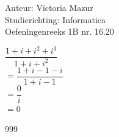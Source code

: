 \documentclass[a4paper]{article}
\begin{document}
  
\noindent \large Auteur: Victoria Mazur \\
\noindent \large Studierichting: Informatica\\
\noindent \large Oefeningenreeks 1B nr. 16.20\\

\medskip

\normalsize

$ \dfrac{1+i+i^2+i^3}{1+i+i^2} $ \\

$ = \dfrac{1+i-1-i}{1+i-1} $ \\

$ = \dfrac{0}{i} $ \\

$ =0 $ 
 
\begin{thebibliography}{999}
\end{thebibliography}
\end{document}
